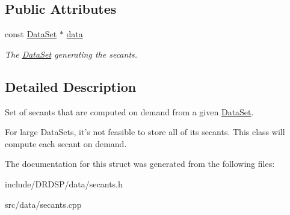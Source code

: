 \subsection*{Public Attributes}
\begin{DoxyCompactItemize}
\item 
\hypertarget{struct_d_r_d_s_p_1_1_secants_data_a1f2646fe6bfc11fdcf779344fc8d532c}{const \hyperlink{struct_d_r_d_s_p_1_1_data_set}{Data\-Set} $\ast$ \hyperlink{struct_d_r_d_s_p_1_1_secants_data_a1f2646fe6bfc11fdcf779344fc8d532c}{data}}\label{struct_d_r_d_s_p_1_1_secants_data_a1f2646fe6bfc11fdcf779344fc8d532c}

\begin{DoxyCompactList}\small\item\em The \hyperlink{struct_d_r_d_s_p_1_1_data_set}{Data\-Set} generating the secants. \end{DoxyCompactList}\end{DoxyCompactItemize}


\subsection{Detailed Description}
Set of secants that are computed on demand from a given \hyperlink{struct_d_r_d_s_p_1_1_data_set}{Data\-Set}. 

For large Data\-Sets, it's not feasible to store all of its secants. This class will compute each secant on demand. 

The documentation for this struct was generated from the following files\-:\begin{DoxyCompactItemize}
\item 
include/\-D\-R\-D\-S\-P/data/secants.\-h\item 
src/data/secants.\-cpp\end{DoxyCompactItemize}
